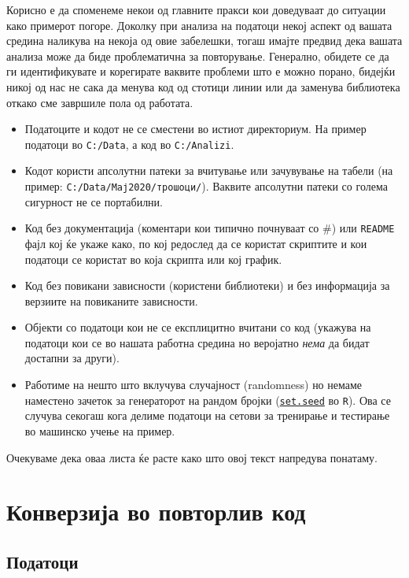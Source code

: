 \documentclass[
]{book}
\begin{document}
Корисно е да споменеме некои од главните пракси кои доведуваат до ситуации како примерот погоре. Доколку при анализа на податоци некој аспект од вашата средина наликува на некоја од овие забелешки, тогаш имајте предвид дека вашата анализа може да биде проблематична за повторување. Генерално, обидете се да ги идентификувате и корегирате ваквите проблеми што е можно порано, бидејќи никој од нас не сака да менува код од стотици линии или да заменува библиотека откако сме завршиле пола од работата.

\begin{itemize}
\item
  Податоците и кодот не се сместени во истиот директориум. На пример податоци во \texttt{C:/Data}, а код во \texttt{C:/Analizi}.
\item
  Кодот користи апсолутни патеки за вчитување или зачувување на табели (на пример: \texttt{C:/Data/Мај2020/трошоци/}). Ваквите апсолутни патеки со голема сигурност не се портабилни.
\item
  Код без документација (коментари кои типично почнуваат со \#) или \texttt{README} фајл кој ќе укаже како, по кој редослед да се користат скриптите и кои податоци се користат во која скрипта или кој график.
\item
  Код без повикани зависности (користени библиотеки) и без информација за верзиите на повиканите зависности.
\item
  Објекти со податоци кои не се експлицитно вчитани со код (укажува на податоци кои се во нашата работна средина но веројатно \emph{нема} да бидат достапни за други).
\item
  Работиме на нешто што вклучува случајност (randomness) но немаме наместено зачеток за генераторот на рандом бројки (\href{https://www.rdocumentation.org/packages/simEd/versions/1.0.3/topics/set.seed}{\texttt{set.seed}} во \texttt{R}). Ова се случува секогаш кога делиме податоци на сетови за тренирање и тестирање во машинско учење на пример.
\end{itemize}

Очекуваме дека оваа листа ќе расте како што овој текст напредува понатаму.

\hypertarget{conversion}{%
\chapter{Конверзија во повторлив код}\label{conversion}}

\hypertarget{ux43fux43eux434ux430ux442ux43eux446ux438}{%
\section{Податоци}\label{ux43fux43eux434ux430ux442ux43eux446ux438}}
\end{document}
